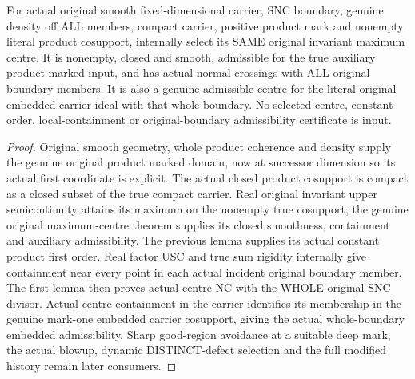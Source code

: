 \begin{theorem}
\label{hir:sharp-original-actual-all-boundary-first-product-centre}
\leanok
For actual original smooth fixed-dimensional carrier, SNC boundary, genuine density off ALL members, compact carrier, positive product mark and nonempty literal product cosupport, internally select its SAME original invariant maximum centre. It is nonempty, closed and smooth, admissible for the true auxiliary product marked input, and has actual normal crossings with ALL original boundary members. It is also a genuine admissible centre for the literal original embedded carrier ideal with that whole boundary. No selected centre, constant-order, local-containment or original-boundary admissibility certificate is input.
\end{theorem}
\begin{proof}
Original smooth geometry, whole product coherence and density supply the genuine original product marked domain, now at successor dimension so its actual first coordinate is explicit. The actual closed product cosupport is compact as a closed subset of the true compact carrier. Real original invariant upper semicontinuity attains its maximum on the nonempty true cosupport; the genuine original maximum-centre theorem supplies its closed smoothness, containment and auxiliary admissibility. The previous lemma supplies its actual constant product first order. Real factor USC and true sum rigidity internally give containment near every point in each actual incident original boundary member. The first lemma then proves actual centre NC with the WHOLE original SNC divisor. Actual centre containment in the carrier identifies its membership in the genuine mark-one embedded carrier cosupport, giving the actual whole-boundary embedded admissibility. Sharp good-region avoidance at a suitable deep mark, the actual blowup, dynamic DISTINCT-defect selection and the full modified history remain later consumers.
\end{proof}

